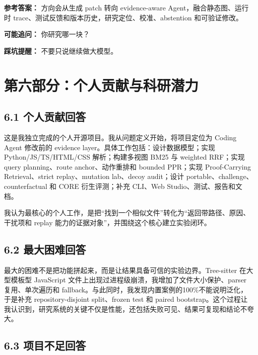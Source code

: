 \documentclass[UTF8,12pt,openany]{ctexbook}
\begin{document}
\textbf{参考答案：} 方向会从生成 patch 转向 evidence-aware Agent，融合静态图、运行时 trace、测试反馈和版本历史，研究定位、校准、abstention 和可验证修改。\par

\textbf{可能追问：} 你研究哪一块？\par

\textbf{踩坑提醒：} 不要只说继续做大模型。\par

\clearpage
\chapter{第六部分：个人贡献与科研潜力}

\section{6.1 个人贡献回答}

这是我独立完成的个人开源项目。我从问题定义开始，将项目定位为 Coding Agent 修改前的 evidence layer。具体工作包括：设计数据模型；实现 Python/JS/TS/HTML/CSS 解析；构建多视图 BM25 与 weighted RRF；实现 query planning、route anchor、动作重排和 bounded PPR；实现 Proof-Carrying Retrieval、strict replay、mutation lab、decoy audit；设计 portable、challenge、counterfactual 和 CORE 衍生评测；补充 CLI、Web Studio、测试、报告和文档。\par

我认为最核心的个人工作，是把“找到一个相似文件”转化为“返回带路径、原因、干扰项和 replay 能力的证据对象”，并围绕这个核心建立实验闭环。\par

\section{6.2 最大困难回答}

最大的困难不是把功能拼起来，而是让结果具备可信的实验边界。Tree-sitter 在大型模板型 JavaScript 文件上出现过进程级崩溃，我增加了文件大小保护、parser 复用、单次遍历和 fallback。与此同时，我发现内置案例的100\%不能说明泛化，于是补充 repository-disjoint split、frozen test 和 paired bootstrap。这个过程让我认识到，研究系统的关键不仅是性能，还包括失败可见、结果可复现和结论不夸大。\par

\section{6.3 项目不足回答}
\end{document}
